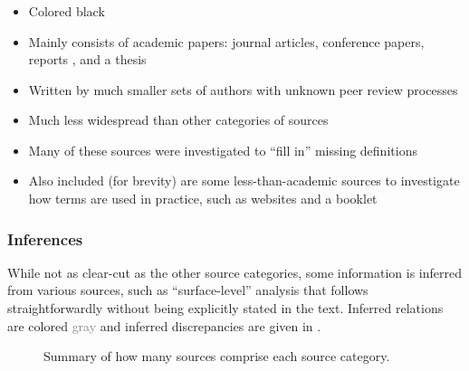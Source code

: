 \subsubsection{}
\label{papers}
\begin{itemize}
    \item Colored black
    \item Mainly consists of academic papers: journal articles, conference
          papers, reports \citep{Kam2008,Gerrard2000a,Gerrard2000b}, and a
          thesis \citep{Bas2024}
    \item Written by much smaller sets of authors with unknown peer review
          processes
    \item Much less widespread than other categories of sources
    \item Many of these sources were investigated to ``fill in''
          missing definitions
    \item Also included (for brevity) are some less-than-academic sources to
          investigate how terms are used in practice, such as websites
          \citep{LambdaTest2024,Pandey2023} and a booklet \citep{SPICE2022}
\end{itemize}

\ifnotpaper
    \subsubsection{Inferences}
    \label{infers}
    While not as clear-cut as the other source categories, some information is
    inferred from various sources, such as ``surface-level'' analysis that
    follows straightforwardly without being explicitly stated in the text.
    Inferred relations are colored \textcolor{gray}{gray} and
    inferred discrepancies are given in .
\fi

\begin{figure}
    \centering
    \caption{Summary of how many sources comprise each source category.}
    \label{fig:sourceSummary}
\end{figure}

